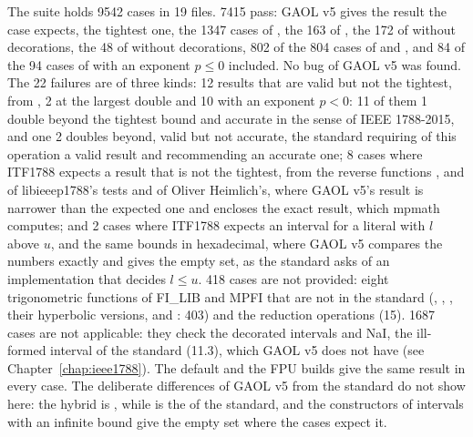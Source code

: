 \medskip
The suite holds 9542 cases in 19 files. 7415 pass: GAOL v5 gives the result
the case expects, the tightest one, the 1347 cases of , the 163
of , the 172 of  without decorations, the 48
of  without decorations, 802 of the 804 cases of
 and , and 84 of the 94 cases of 
with an exponent $p \leq 0$ included. No bug of GAOL v5 was found. The 22
failures are of three kinds: 12 results that are valid but not the
tightest, from , 2 at the largest double and 10 with an
exponent $p < 0$: 11 of them 1 double beyond the tightest bound and accurate in the sense of IEEE 1788-2015, and one 2 doubles beyond, valid but not accurate, the standard requiring of
this operation a valid result and recommending an accurate one; 8 cases where
ITF1788 expects a result that is not the tightest, from the reverse
functions ,  and  of libieeep1788's
tests and  of Oliver Heimlich's, where GAOL v5's result is
narrower than the expected one and encloses the exact result, which mpmath
computes; and 2 cases where ITF1788 expects an interval for a literal
\code{[l, u]} with $l$ above $u$, \code{[1.0000000000000002,1.0000000000000001]}
and the same bounds in hexadecimal, where GAOL v5 compares the numbers
exactly and gives the empty set, as the standard asks of an implementation
that decides $l \leq u$. 418 cases are not provided: eight trigonometric
functions of FI\_LIB and MPFI that are not in the standard (,
, , their hyperbolic versions,  and
: 403) and the reduction operations (15). 1687 cases are not
applicable: they check the decorated intervals and NaI, the ill-formed interval of the
standard (11.3), which GAOL v5 does not have (see Chapter~\ref{chap:ieee1788}). The default and the FPU builds give the
same result in every case. The deliberate differences of GAOL v5 from the
standard do not show here: the hybrid  is , while
 is the  of the standard, and the
constructors of intervals with an infinite bound give the empty set where
the cases expect it.

